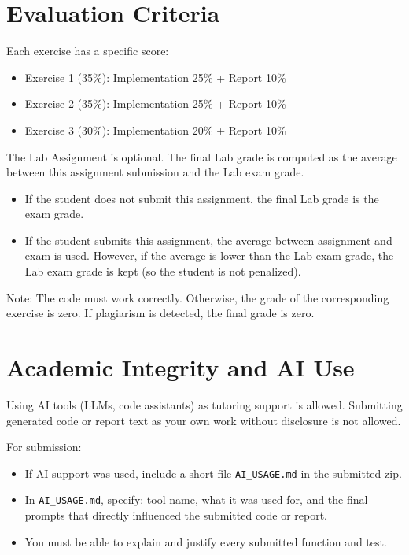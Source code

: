 \documentclass[11pt,a4paper]{article}
\begin{document}
\section*{Evaluation Criteria}
Each exercise has a specific score:
\begin{itemize}[leftmargin=*]
    \item Exercise 1 (35\%): Implementation 25\% + Report 10\%
    \item Exercise 2 (35\%): Implementation 25\% + Report 10\%
    \item Exercise 3 (30\%): Implementation 20\% + Report 10\%
\end{itemize}

The Lab Assignment is optional. The final Lab grade is computed as the average between this
assignment submission and the Lab exam grade.
\begin{itemize}[leftmargin=*]
    \item If the student does not submit this assignment, the final Lab grade is the exam grade.
    \item If the student submits this assignment, the average between assignment and exam is used.
    However, if the average is lower than the Lab exam grade, the Lab exam grade is kept
    (so the student is not penalized).
\end{itemize}

Note: The code must work correctly. Otherwise, the grade of the corresponding
exercise is zero. If plagiarism is detected, the final grade is zero.

\section*{Academic Integrity and AI Use}
Using AI tools (LLMs, code assistants) as tutoring support is allowed.
Submitting generated code or report text as your own work without disclosure is
not allowed.

For submission:
\begin{itemize}[leftmargin=*]
    \item If AI support was used, include a short file \texttt{AI\_USAGE.md}
    in the submitted zip.
    \item In \texttt{AI\_USAGE.md}, specify: tool name, what it was used for,
    and the final prompts that directly influenced the submitted code or report.
    \item You must be able to explain and justify every submitted function and
    test.
\end{itemize}
\end{document}
